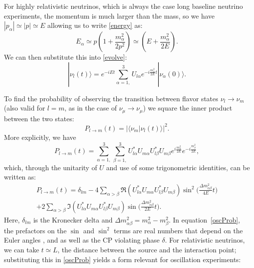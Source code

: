 For highly relativistic neutrinos, which is always the case long baseline neutrino experiments, the momentum is much larger than the mass, so we have $|p_\alpha| \simeq |p| \simeq E$ allowing us to write \eqref{energy} as:  
\begin{equation}\label{energyApprox}
E_\alpha \simeq p(1+\frac{m_\alpha^2}{2p^2})\simeq (E+\frac{m_\alpha^2}{2E}).
\end{equation}
We can then substitute this into \eqref{evolve}:
\begin{equation}\label{evolveSub}
|\nu_l(t) \rangle = e^{-iEt} \sum_{\alpha = 1,}^3 U_{l\alpha}e^{-i\frac{m_\alpha^2}{2E} t}|\nu_\alpha(0) \rangle.
\end{equation}

To find the probability of observing the transition between flavor states $\nu_l \rightarrow \nu_m$ (also valid for $l=m$, as in the case of $\nu_\mu \rightarrow \nu_\mu$) we square the inner product between the two states:
\begin{equation}\label{probSimp}
P_{l\rightarrow m}(t) = |\langle \nu_m | \nu_l(t)\rangle |^2.
\end{equation}
More explicitly, we have 
\begin{equation}\label{probComp}
P_{l\rightarrow m}(t) = \sum_{\alpha = 1,}^3 \sum_{\beta = 1,}^3 U^*_{l\alpha}U_{m\alpha}U^*_{l\beta}U_{m\beta} e^{i\frac{m_\alpha^2}{2E}} e^{-i\frac{m_\beta^2}{2E}}, 
\end{equation}
which, through the unitarity of $U$ and use of some trigonometric identities, can be written as:
\begin{equation}\begin{split}\label{oscProb}
P_{l\rightarrow m}(t) =  \delta_{lm} - 4  \sum_{\alpha > \beta}  \Re(U^*_{l\alpha}U_{m\alpha}U^*_{l\beta}U_{m\beta}) \sin^2 \bigg(\frac{\Delta m_{\alpha\beta}^2}{4E} t\bigg) \\
 + 2  \sum_{\alpha>\beta}  \Im(U^*_{l\alpha}U_{m\alpha}U^*_{l\beta}U_{m\beta}) \sin\bigg(\frac{\Delta m_{\alpha\beta}^2}{2E}t\bigg).
\end{split}\end{equation}
Here, $\delta_{lm}$ is the Kronecker delta and $\Delta m^2_{\alpha\beta} = m_\alpha^2 - m_\beta^2$.  In equation~\eqref{oscProb}, the prefactors on the $\sin$ and $\sin^2$ terms are real numbers that depend on the Euler angles \thetaot, \thetatth and \thetaoth as well as the CP violating phase $\delta$.  For relativistic neutrinos, we can take $t \simeq L$, the distance between the source and the interaction point; substituting this in \eqref{oscProb} yields a form relevant for oscillation experiments:
